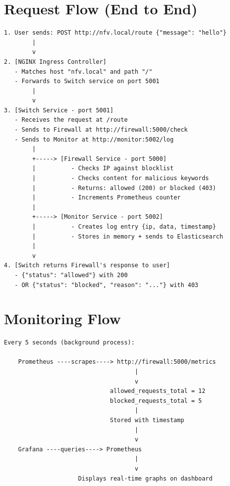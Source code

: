 \documentclass[12pt,a4paper]{article}
\begin{document}
\section{Request Flow (End to End)}

\begin{verbatim}
1. User sends: POST http://nfv.local/route {"message": "hello"}
        |
        v
2. [NGINX Ingress Controller]
   - Matches host "nfv.local" and path "/"
   - Forwards to Switch service on port 5001
        |
        v
3. [Switch Service - port 5001]
   - Receives the request at /route
   - Sends to Firewall at http://firewall:5000/check
   - Sends to Monitor at http://monitor:5002/log
        |
        +-----> [Firewall Service - port 5000]
        |          - Checks IP against blocklist
        |          - Checks content for malicious keywords
        |          - Returns: allowed (200) or blocked (403)
        |          - Increments Prometheus counter
        |
        +-----> [Monitor Service - port 5002]
        |          - Creates log entry {ip, data, timestamp}
        |          - Stores in memory + sends to Elasticsearch
        |
        v
4. [Switch returns Firewall's response to user]
   - {"status": "allowed"} with 200
   - OR {"status": "blocked", "reason": "..."} with 403
\end{verbatim}

\section{Monitoring Flow}

\begin{verbatim}
Every 5 seconds (background process):

    Prometheus ----scrapes----> http://firewall:5000/metrics
                                     |
                                     v
                              allowed_requests_total = 12
                              blocked_requests_total = 5
                                     |
                              Stored with timestamp
                                     |
                                     v
    Grafana ----queries----> Prometheus
                                     |
                                     v
                     Displays real-time graphs on dashboard
\end{verbatim}
\end{document}
